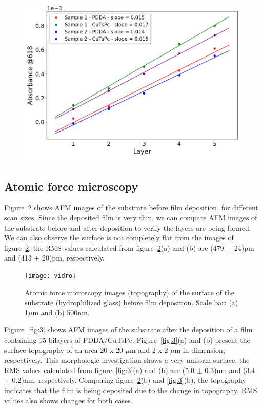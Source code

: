 \documentclass[%
 reprint,
 amsmath,amssymb,
 aps,
]{revtex4-1}
\begin{document}
\begin{figure}[h!]
	\centering
	\includegraphics[width=0.8\columnwidth]{rafael}
	\caption{}
	\label{fig:rafael}
\end{figure}



\subsection{Atomic force microscopy}

Figure~\ref{fig:1} shows AFM images of the substrate before film deposition, for different scan sizes. Since the deposited film is very thin, we can compare AFM images of the substrate before and after deposition to verify the layers are being formed. We can also observe the surface is not completely flat from the images of figure~\ref{fig:1}, the RMS values calculated from figure~\ref{fig:1}(a) and (b) are (479 $\pm$ 24)pm and (413 $\pm$ 20)pm, respectively. 

\begin{figure}[h!]
	\centering
	\texttt{[image: vidro]}
	\caption{Atomic force microscopy images (topography) of the surface of the substrate (hydrophilized glass) before film deposition. Scale bar: (a) 1$\mu$m and (b) 500nm.}
	\label{fig:1}
\end{figure}

Figure~\ref{fig:3} shows AFM images of the substrate after the deposition of a film containing 15 bilayers of PDDA/CuTsPc. Figure~\ref{fig:3}(a) and (b) present the surface topography of an area 20 x 20 $\mu$m and 2 x 2 $\mu$m in dimension, respectively. This morphologic investigation shows a very uniform surface, the RMS values calculated from figure~\ref{fig:3}(a) and (b) are (5.0 $\pm$ 0.3)nm and (3.4 $\pm$ 0.2)nm, respectively. Comparing figure~\ref{fig:1}(b) and \ref{fig:3}(b), the topography indicates that the film is being deposited due to the change in topography, RMS values also shows changes for both cases.
\end{document}
